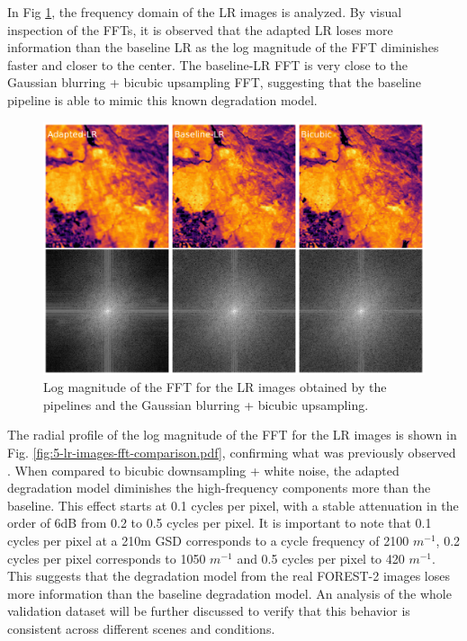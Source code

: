         In Fig \ref{fig:5-lr-images-fft.pdf}, the frequency domain of the LR images is analyzed.
        By visual inspection of the FFTs, it is observed that the adapted LR loses more information than the baseline LR as the log magnitude of the FFT diminishes faster and closer to the center.
        The baseline-LR FFT is very close to the Gaussian blurring + bicubic upsampling FFT, suggesting that the baseline pipeline is able to mimic this known degradation model.

        \begin{figure}[H]
            \centering
            \includegraphics[scale=0.3]{Includes/5-lr-images-fft.pdf}
            \caption{Log magnitude of the FFT for the LR images obtained by the pipelines and the Gaussian blurring + bicubic upsampling.}
            \label{fig:5-lr-images-fft.pdf}
        \end{figure}

        The radial profile of the log magnitude of the FFT for the LR images is shown in Fig. \ref{fig:5-lr-images-fft-comparison.pdf}, confirming what was previously observed . When compared to bicubic downsampling + white noise,
        the adapted degradation model diminishes the high-frequency components more than the baseline. This effect starts at 0.1 cycles per pixel, with a stable attenuation in the order of 6dB from 0.2 to 0.5 cycles per pixel. 
        It is important to note that 0.1 cycles per pixel at a 210m GSD corresponds to a cycle frequency of 2100 $m^{-1}$, 0.2 cycles per pixel corresponds to 1050 $m^{-1}$ and 0.5 cycles per pixel to 420 $m^{-1}$.
        This suggests that the degradation model from the real FOREST-2 images loses more information than the baseline degradation model.
        An analysis of the whole validation dataset will be further discussed to verify that this behavior is consistent across different scenes and conditions.


